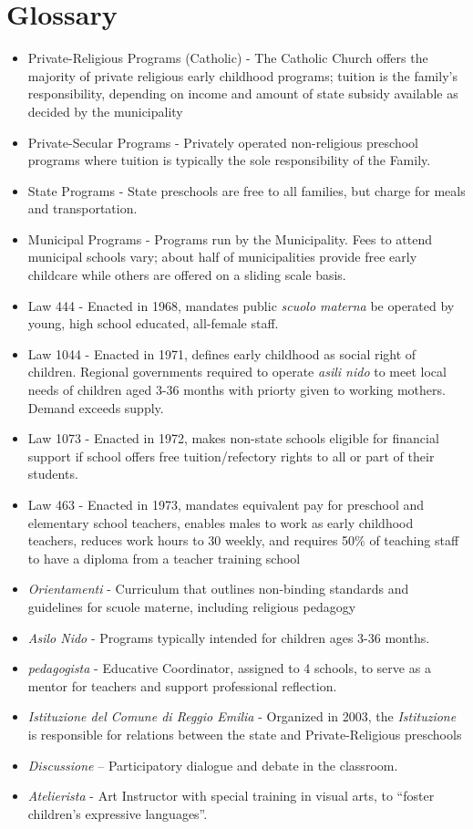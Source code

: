 \documentclass[11pt]{article}
\begin{document}
\section{Glossary}
\begin{itemize}
	\item Private-Religious Programs (Catholic) - The Catholic Church offers the majority of private religious early
	childhood programs; tuition is the family’s responsibility, depending on income and amount
	of state subsidy available as decided by the municipality
	
\item Private-Secular Programs - Privately operated non-religious preschool programs where tuition is typically the sole responsibility of the Family.

\item State Programs - State preschools
are free to all families, but charge for meals and transportation.
\item Municipal Programs - Programs run by the Municipality. Fees to attend municipal
schools vary; about half of municipalities provide free early childcare while others are offered
on a sliding scale basis.
\item Law 444 - Enacted in 1968, mandates public \textit{scuolo materna} be operated by young, high school educated, all-female staff.
\item Law 1044 - Enacted in 1971, defines early childhood as social right of children. Regional governments  required to operate \textit{asili nido} to meet local needs of children aged 3-36 months with priorty given to working mothers. Demand exceeds supply.
\item Law 1073 - Enacted in 1972, makes non-state schools eligible for financial support if school offers free tuition/refectory rights to all or part of their students.
\item Law 463 - Enacted in 1973, mandates equivalent pay for preschool and elementary school teachers,
enables males to work as early childhood teachers, reduces work hours
to 30 weekly, and requires 50\% of teaching staff to have a diploma from a
teacher training school
\item \textit{Orientamenti} - Curriculum that outlines non-binding standards and guidelines for scuole
materne, including religious pedagogy 
\item \textit{Asilo Nido} - Programs typically intended for children ages 3-36 months.
\item \textit{pedagogista} - Educative Coordinator, assigned to 4 schools, to serve as a mentor for
teachers and support professional reflection.
\item \textit{Istituzione del Comune di Reggio Emilia} - Organized in 2003, the \textit{Istituzione} is responsible for relations between the state and Private-Religious preschools 
\item \textit{Discussione} – Participatory dialogue and debate in the classroom.
\item \textit{Atelierista} - Art Instructor with special training in visual arts, to “foster children’s
expressive languages”.

\end{itemize}

 
\singlespacing


\pagebreak
\end{document}
